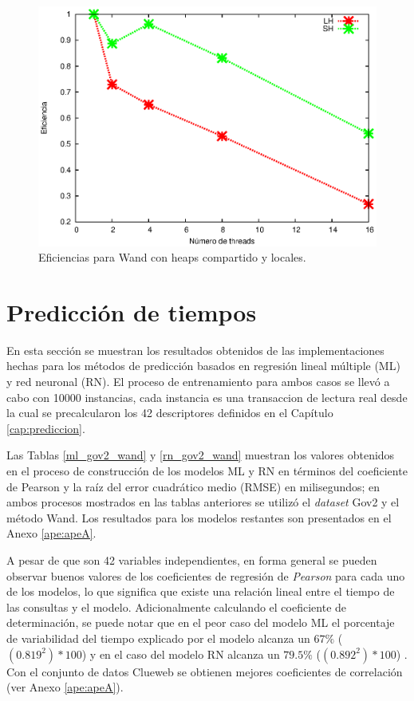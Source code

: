 \begin{figure}[tp]
\centering
\includegraphics[scale=.75]{images/eficiencias_wand.eps}
\caption{Eficiencias para Wand con heaps compartido y locales.}
\label{fig:eficiencias_wand}
\end{figure}

\section{Predicción de tiempos}
\label{evaluacionexperimental:predicciontiempos}
En esta sección se muestran los resultados obtenidos de las implementaciones hechas para los métodos de predicción basados en regresión lineal múltiple (ML) y red neuronal (RN). El proceso de entrenamiento para ambos casos se llevó a cabo con 10000 instancias, cada instancia es una transaccion de lectura real desde la cual se precalcularon los 42 descriptores definidos en el Capítulo \ref{cap:prediccion}. 

Las Tablas \ref{ml_gov2_wand} y \ref{rn_gov2_wand} muestran los valores obtenidos en el proceso de construcción de los modelos ML y RN en términos del coeficiente de Pearson y la raíz del error cuadrático medio (RMSE) en milisegundos; en ambos procesos mostrados en las tablas anteriores se utilizó el \textit{dataset} Gov2 y el método Wand. Los resultados para los modelos restantes son presentados en el Anexo \ref{ape:apeA}. 

A pesar de que son 42 variables independientes, en forma general se pueden observar buenos valores de los coeficientes de regresión de \textit{Pearson} para cada uno de los modelos, lo que significa que existe una relación lineal entre el tiempo de las consultas y el modelo. Adicionalmente calculando el coeficiente de determinación, se puede notar que en el peor caso del modelo ML el porcentaje de variabilidad del tiempo explicado por el modelo alcanza un $67\%$ ($(0.819^2) * 100$) y en el caso del modelo RN alcanza un $79.5\%$ ($(0.892^2) * 100$) . Con el conjunto de datos Clueweb se obtienen mejores coeficientes de correlación (ver Anexo \ref{ape:apeA}).

